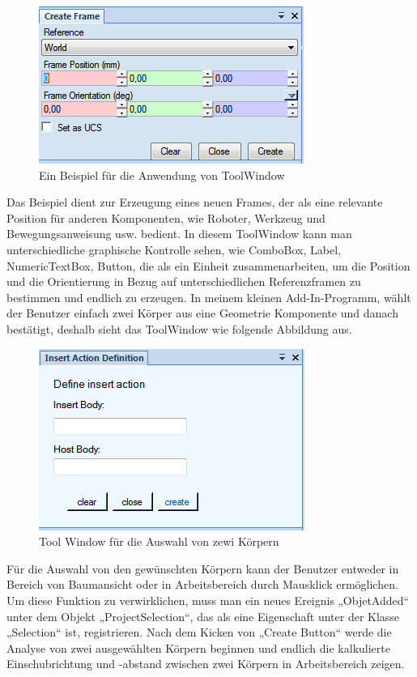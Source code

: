 \documentclass[14pt,a4paper,titlepage]{article}
\begin{document}
\begin{itemize}
				\begin{figure}[h!]
					\centering
					\includegraphics[width=0.8\linewidth]{toolwindow.png}
					\caption{Ein Beispiel für die Anwendung von ToolWindow}
				\end{figure}
				\pagebreak
				Das Beispiel dient zur Erzeugung eines neuen Frames, der als eine relevante Position für anderen Komponenten, wie Roboter, Werkzeug und Bewegungsanweisung usw. bedient. In diesem ToolWindow kann man unterschiedliche graphische Kontrolle sehen, wie ComboBox, Label, NumericTextBox, Button, die als ein Einheit zusammenarbeiten, um die Position und die Orientierung in Bezug auf unterschiedlichen Referenzframen zu bestimmen und endlich zu erzeugen.
				\bigbreak
				In meinem kleinen Add-In-Programm, wählt der Benutzer einfach zwei Körper aus eine Geometrie Komponente und danach bestätigt, deshalb sieht das ToolWindow wie folgende Abbildung aus. \bigbreak
				\begin{figure}[h!]
					\centering
					\includegraphics[width=0.8\linewidth]{inserttoolwindow.png}
					\caption{Tool Window für die Auswahl von zewi Körpern}
				\end{figure}
				Für die Auswahl von den gewünschten Körpern kann der Benutzer entweder in Bereich von Baumansicht oder in Arbeitsbereich durch Mausklick ermöglichen.  Um diese Funktion zu verwirklichen, muss man ein neues Ereignis „ObjetAdded“ unter dem Objekt „ProjectSelection“, das als eine Eigenschaft unter der Klasse „Selection“ ist, registrieren. Nach dem Kicken von „Create Button“ werde die Analyse von zwei ausgewählten Körpern beginnen und endlich die kalkulierte Einschubrichtung und -abstand zwischen zwei Körpern in Arbeitsbereich zeigen. 

\end{itemize}
\end{document}
